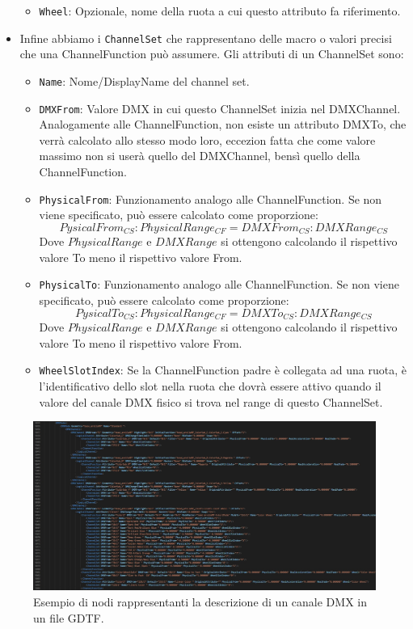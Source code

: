 \documentclass[main.tex]{subfiles}
\begin{document}
\begin{itemize}
\begin{itemize}
            \item \lstinline{Wheel}: Opzionale, nome della ruota a cui questo attributo fa riferimento.
        \end{itemize}
    \item Infine abbiamo i \lstinline{ChannelSet} che rappresentano delle macro o valori precisi che una ChannelFunction può assumere. Gli attributi di un ChannelSet sono: \begin{itemize}
            \item \lstinline{Name}: Nome/DisplayName del channel set.
            \item \lstinline{DMXFrom}: Valore DMX in cui questo ChannelSet inizia nel DMXChannel. Analogamente alle ChannelFunction, non esiste un attributo DMXTo, che verrà calcolato allo stesso modo loro, eccezion fatta che come valore massimo non si userà quello del DMXChannel, bensì quello della ChannelFunction. 
            \item \lstinline{PhysicalFrom}: Funzionamento analogo alle ChannelFunction. Se non viene specificato, può essere calcolato come proporzione:
            \[PysicalFrom_{CS} : PhysicalRange_{CF} = DMXFrom_{CS} : DMXRange_{CS}\]
            Dove $PhysicalRange$ e $DMXRange$ si ottengono calcolando il rispettivo valore To meno il rispettivo valore From.
            \item \lstinline{PhysicalTo}: Funzionamento analogo alle ChannelFunction. Se non viene specificato, può essere calcolato come proporzione:
            \[PysicalTo_{CS} : PhysicalRange_{CF} = DMXTo_{CS} : DMXRange_{CS}\]
            Dove $PhysicalRange$ e $DMXRange$ si ottengono calcolando il rispettivo valore To meno il rispettivo valore From.
            \item \lstinline{WheelSlotIndex}: Se la ChannelFunction padre è collegata ad una ruota, è l'identificativo dello slot nella ruota che dovrà essere attivo quando il valore del canale DMX fisico si trova nel range di questo ChannelSet.
        \end{itemize}
\end{itemize}
\begin{figure}[H]
    \centering
    \includegraphics[width=1\linewidth]{img/introduzione/GDTFdmxExample.jpg}
    \caption{Esempio di nodi rappresentanti la descrizione di un canale DMX in un file GDTF.}
    \label{fig:1_gdtfDmxExample}
\end{figure}
\end{document}
